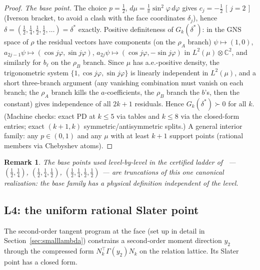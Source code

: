 \documentclass[11pt]{article}
\newtheorem{remark}[theorem]{Remark}
\begin{document}
\begin{proof}
\emph{The base point.} The choice $p=\tfrac12$,
$d\mu=\tfrac1\pi\sin^2\!\varphi\,d\varphi$ gives
$c_j=-\tfrac12\,[\,j=2\,]$ (Iverson bracket, to avoid a clash with the face
coordinates $\delta_j$), hence
$\delta=(\tfrac12,\tfrac14,\tfrac12,\tfrac12,\dots)=\delta^\ast$ exactly.
Positive definiteness of $G_k(\delta^\ast)$: in the GNS space of $\rho$ the
residual vectors have components (on the $\rho_A$ branch)
$\psi\mapsto(1,0)$, $a_{2j-1}\psi\mapsto(\cos j\varphi,\sin j\varphi)$,
$a_{2j}\psi\mapsto(\cos j\varphi,-\sin j\varphi)$ in
$L^2(\mu)\otimes\mathbb C^2$, and similarly for $b_\ell$ on the $\rho_B$
branch. Since $\mu$ has a.e.-positive density, the trigonometric system
$\{1,\cos j\varphi,\sin j\varphi\}$ is linearly independent in $L^2(\mu)$,
and a short three-branch argument (any vanishing combination must vanish on
each branch; the $\rho_A$ branch kills the $a$-coefficients, the $\rho_B$
branch the $b$'s, then the constant) gives independence of all $2k+1$
residuals. Hence $G_k(\delta^\ast)\succ0$ for all $k$. (Machine checks:
exact PD at $k\le5$ via tables and $k\le8$ via the closed-form entries;
exact $(k{+}1,k)$ symmetric/antisymmetric splits.) A general interior
family: any $p\in(0,1)$ and any $\mu$ with at least $k+1$ support points
(rational members via Chebyshev atoms).
\end{proof}

\begin{remark}
The base points used level-by-level in the certified ladder
of~\cite{overshoot} --- $(\tfrac12,\tfrac14)$,
$(\tfrac12,\tfrac14,\tfrac12)$, $(\tfrac12,\tfrac14,\tfrac12,\tfrac12)$ ---
are truncations of this one canonical realization: the base family has a
physical definition independent of the level.
\end{remark}

\subsection{L4: the uniform rational Slater point}

The second-order tangent program at the face (set up in detail in
Section~\ref{sec:smalllambda}) constrains a second-order moment direction
$y_2$ through the compressed form $N_k^\top\Gamma(y_2)N_k$ on the relation
lattice. Its Slater point has a closed form.
\end{document}

